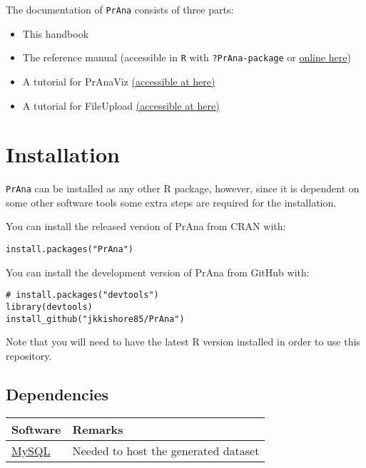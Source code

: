 \documentclass[
]{book}
\providecommand{\tightlist}{%
  \setlength{\itemsep}{0pt}\setlength{\parskip}{0pt}}
\begin{document}
The documentation of \texttt{PrAna} consists of three parts:

\begin{itemize}
\tightlist
\item
  This handbook
\item
  The reference manual (accessible in \texttt{R} with \texttt{?PrAna-package} or \href{https://github.bath.ac.uk/kjj28/PrAna/reference/index.html}{online here})
\item
  A tutorial for PrAnaViz \href{https://github.bath.ac.uk/pages/kjj28/PrAna/articles/PrAnaViz_Tutoral.html}{(accessible at here)}
\item
  A tutorial for FileUpload \href{https://github.bath.ac.uk/pages/kjj28/PrAna/articles/PrAnaViz_Tutoral.html}{(accessible at here)}
\end{itemize}

\hypertarget{install}{%
\chapter{Installation}\label{install}}

\texttt{PrAna} can be installed as any other R package, however, since it is dependent on some other software tools some extra steps are required for the installation.

You can install the released version of PrAna from CRAN with:

\begin{verbatim}
install.packages("PrAna")
\end{verbatim}

You can install the development version of PrAna from GitHub with:

\begin{verbatim}
# install.packages("devtools")
library(devtools)
install_github("jkkishore85/PrAna")
\end{verbatim}

Note that you will need to have the latest R version installed in order to use this repository.

\hypertarget{dependencies}{%
\section{Dependencies}\label{dependencies}}

\begin{longtable}[]{@{}ll@{}}
\toprule
Software & Remarks\tabularnewline
\midrule
\endhead
\href{https://www.mysql.com/}{MySQL} & Needed to host the generated dataset\tabularnewline
\bottomrule
\end{longtable}
\end{document}
